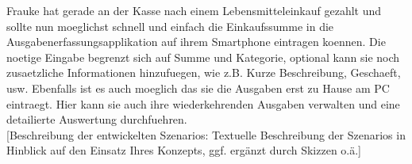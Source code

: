 Frauke hat gerade an der Kasse nach einem Lebensmitteleinkauf gezahlt und
sollte nun moeglichst schnell und einfach die Einkaufssumme in die
Ausgabenerfassungsapplikation auf ihrem Smartphone eintragen koennen. Die 
noetige Eingabe begrenzt sich auf Summe und Kategorie, optional kann sie noch 
zusaetzliche Informationen hinzufuegen, wie z.B. Kurze Beschreibung, Geschaeft, 
usw. Ebenfalls ist es auch moeglich das sie die Ausgaben erst zu Hause am PC 
eintraegt. Hier kann sie auch ihre wiederkehrenden Ausgaben verwalten und eine 
detailierte Auswertung durchfuehren.\\

[Beschreibung der entwickelten Szenarios: Textuelle Beschreibung der Szenarios in Hinblick auf den Einsatz Ihres Konzepts, ggf. ergänzt durch Skizzen o.ä.]
